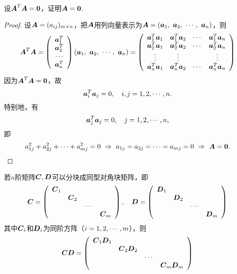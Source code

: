 \begin{frame}
  \begin{li}
    设$\MA^T\MA=\M0$，证明$\MA=\M0$.
  \end{li}
  \pause
  \begin{proof}
    设$\boldsymbol{A}=(a_{ij})_{m\times n}$，把$\boldsymbol{A}$用列向量表示为$\boldsymbol{A}=({\boldsymbol{a}}_1, ~{\boldsymbol{a}}_2,~\cdots,~{\boldsymbol{a}}_n)$，则
    $$
    \boldsymbol{A}^T\boldsymbol{A} = \left(
      \begin{array}{c}
        {\boldsymbol{a}}_1^T\\
        {\boldsymbol{a}}_2^T\\
        \cdots \\
        {\boldsymbol{a}}_n^T
      \end{array}
    \right) ({\boldsymbol{a}}_1, ~{\boldsymbol{a}}_2,~\cdots,~{\boldsymbol{a}}_n) = \left(
      \begin{array}{cccc}
        {\boldsymbol{a}}_1^T{\boldsymbol{a}}_1 & {\boldsymbol{a}}_1^T{\boldsymbol{a}}_2 & \cdots & {\boldsymbol{a}}_1^T{\boldsymbol{a}}_n\\
        {\boldsymbol{a}}_2^T{\boldsymbol{a}}_1 & {\boldsymbol{a}}_2^T{\boldsymbol{a}}_2 & \cdots & {\boldsymbol{a}}_2^T{\boldsymbol{a}}_n\\
        \vdots & \vdots & & \vdots \\
        {\boldsymbol{a}}_n^T{\boldsymbol{a}}_1 & {\boldsymbol{a}}_n^T{\boldsymbol{a}}_2 & \cdots & {\boldsymbol{a}}_n^T{\boldsymbol{a}}_n
      \end{array}
    \right)
    $$
    \pause
    因为$\MA^T\MA=\M0$，故
    $$
    {\boldsymbol{a}}_i^T {\boldsymbol{a}}_j = 0, \quad i,j=1,2,\cdots,n.
    $$
    \pause
    特别地，有
    $$
    {\boldsymbol{a}}_j^T {\boldsymbol{a}}_j = 0, \quad j=1,2,\cdots,n,
    $$
    即
    $$
    a_{1j}^2+a_{2j}^2+\cd+a_{mj}^2=0  ~\Rightarrow~ a_{1j}=a_{2j}=\cd=a_{mj}=0 ~\Rightarrow~ \MA = \M0.
    $$
  \end{proof}
\end{frame}

\begin{frame}

  \begin{li}
    若$n$阶矩阵$\boldsymbol{C},\boldsymbol{D}$可以分块成同型对角块矩阵，即
    $$
    \boldsymbol{C} = \left(
      \begin{array}{cccc}
        \boldsymbol{C}_1&&&\\
            &\boldsymbol{C}_2&&\\
            &&\cdots&\\
            &&&\boldsymbol{C}_m
      \end{array}
    \right),\quad
    \boldsymbol{D} = \left(
      \begin{array}{cccc}
        \boldsymbol{D}_1&&&\\
            &\boldsymbol{D}_2&&\\
            &&\cdots&\\
            &&&\boldsymbol{D}_m
      \end{array}
    \right)
    $$
    其中$\boldsymbol{C}_i$和$\boldsymbol{D}_i$为同阶方阵（$i=1,2,\cdots,m$），则
    $$
    \boldsymbol{C}\boldsymbol{D} = \left(
      \begin{array}{cccc}
        \boldsymbol{C}_1\boldsymbol{D}_1&&&\\
                &\boldsymbol{C}_2\boldsymbol{D}_2&&\\
                &&\cdots&\\
                &&&\boldsymbol{C}_m\boldsymbol{D}_m
      \end{array}
    \right)
    $$
  \end{li}

\end{frame}

